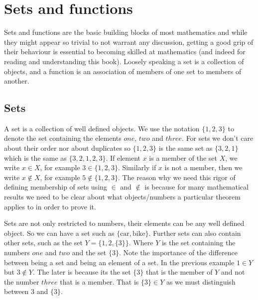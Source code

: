 \chapter{Sets and functions}

Sets and functions are the basic building blocks of most mathematics and while they might appear so trivial to not warrant any discussion, getting a good grip of their behaviour is essential to becoming skilled at mathematics (and indeed for reading and understanding this book). Loosely speaking a set is a collection of objects, and a function is an association of members of one set to members of another. 

\section{Sets}
A set is a collection of well defined objects. We use the notation $\{1,2,3\}$ to denote the set containing the elements $one$, $two$ and $three$. For sets we don't care about their order nor about duplicates so $\{1,2,3\}$ is the same set as $\{3,2,1\}$ which is the same as $\{3,2,1,2,3\}$. If element $x$ is a member of the set $X$, we write $x \in X$, for example $3 \in \{1,2,3\}$. Similarly if $x$ is not a member, then we write $x \notin X$, for example $5 \notin \{1,2,3\}$. The reason why we need this rigor of defining membership of sets using $\in$ and $\notin$ is because for many mathematical results we need to be clear about what objects/numbers a particular theorem applies to in order to prove it.
 
\bigskip
Sets are not only restricted to numbers, their elements can be any well defined object. So we can have a set such as $\{\text{car}, \text{bike}\}$. Further sets can also contain other sets, such as the set $Y = \{1, 2, \{3\}\}$. Where $Y$ is the set containing the numbers $one$ and $two$ and the set $\{3\}$. Note the importance of the difference between being a set and being an element of a set. In the previous example $1 \in Y$ but $3 \notin Y$. The later is because its the set $\{3\}$ that is the member of $Y$ and not the number $three$ that is a member. That is $\{3\} \in Y$ as we must distinguish between $3$ and $\{3\}$.


